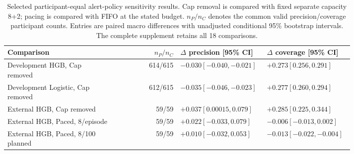\begin{table}[htbp]
\centering
\small
\setlength{\tabcolsep}{3pt}
\caption{Selected participant-equal alert-policy sensitivity results. Cap removal is compared with fixed separate capacity 8+2; pacing is compared with FIFO at the stated budget. $n_P/n_C$ denotes the common valid precision/coverage participant counts. Entries are paired macro differences with unadjusted conditional 95\% bootstrap intervals. The complete supplement retains all 18 comparisons.}
\label{tab:participant-policy-sensitivity}
\begin{tabular}{p{0.31\linewidth}r p{0.25\linewidth}p{0.25\linewidth}}
\hline
Comparison & $n_P/n_C$ & $\Delta$ precision [95\% CI] & $\Delta$ coverage [95\% CI] \\
\hline
Development HGB, Cap removed & 614/615 & $-0.030 [-0.040, -0.021]$ & $+0.273 [0.256, 0.291]$ \\
Development Logistic, Cap removed & 612/615 & $-0.035 [-0.046, -0.023]$ & $+0.277 [0.260, 0.294]$ \\
External HGB, Cap removed & 59/59 & $+0.037 [0.00015, 0.079]$ & $+0.285 [0.225, 0.344]$ \\
External HGB, Paced, 8/episode & 59/59 & $+0.022 [-0.033, 0.079]$ & $-0.006 [-0.013, 0.002]$ \\
External HGB, Paced, 8/100 planned & 59/59 & $+0.010 [-0.032, 0.053]$ & $-0.013 [-0.022, -0.004]$ \\
\hline
\end{tabular}
\end{table}
